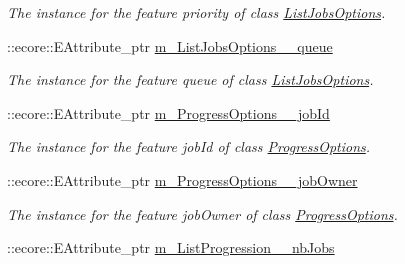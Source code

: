 \begin{DoxyCompactItemize}
\begin{DoxyCompactList}\small\item\em The instance for the feature priority of class \hyperlink{classTMS__Data_1_1ListJobsOptions}{ListJobsOptions}. \item\end{DoxyCompactList}\item 
\hypertarget{classTMS__Data_1_1TMS__DataPackage_aa2d9b4def1c0276a780dab3227ecbbb6}{
::ecore::EAttribute\_\-ptr \hyperlink{classTMS__Data_1_1TMS__DataPackage_aa2d9b4def1c0276a780dab3227ecbbb6}{m\_\-ListJobsOptions\_\-\_\-queue}}
\label{classTMS__Data_1_1TMS__DataPackage_aa2d9b4def1c0276a780dab3227ecbbb6}

\begin{DoxyCompactList}\small\item\em The instance for the feature queue of class \hyperlink{classTMS__Data_1_1ListJobsOptions}{ListJobsOptions}. \item\end{DoxyCompactList}\item 
\hypertarget{classTMS__Data_1_1TMS__DataPackage_aed667e304dd9dadadbe35e3502bf85f2}{
::ecore::EAttribute\_\-ptr \hyperlink{classTMS__Data_1_1TMS__DataPackage_aed667e304dd9dadadbe35e3502bf85f2}{m\_\-ProgressOptions\_\-\_\-jobId}}
\label{classTMS__Data_1_1TMS__DataPackage_aed667e304dd9dadadbe35e3502bf85f2}

\begin{DoxyCompactList}\small\item\em The instance for the feature jobId of class \hyperlink{classTMS__Data_1_1ProgressOptions}{ProgressOptions}. \item\end{DoxyCompactList}\item 
\hypertarget{classTMS__Data_1_1TMS__DataPackage_a8fb4b1907e6edbed9fca7055f2131eb3}{
::ecore::EAttribute\_\-ptr \hyperlink{classTMS__Data_1_1TMS__DataPackage_a8fb4b1907e6edbed9fca7055f2131eb3}{m\_\-ProgressOptions\_\-\_\-jobOwner}}
\label{classTMS__Data_1_1TMS__DataPackage_a8fb4b1907e6edbed9fca7055f2131eb3}

\begin{DoxyCompactList}\small\item\em The instance for the feature jobOwner of class \hyperlink{classTMS__Data_1_1ProgressOptions}{ProgressOptions}. \item\end{DoxyCompactList}\item 
\hypertarget{classTMS__Data_1_1TMS__DataPackage_a8fb9506ced8a05d99f2800c5ef9f6d5f}{
::ecore::EAttribute\_\-ptr \hyperlink{classTMS__Data_1_1TMS__DataPackage_a8fb9506ced8a05d99f2800c5ef9f6d5f}{m\_\-ListProgression\_\-\_\-nbJobs}}
\label{classTMS__Data_1_1TMS__DataPackage_a8fb9506ced8a05d99f2800c5ef9f6d5f}


\end{DoxyCompactItemize}
